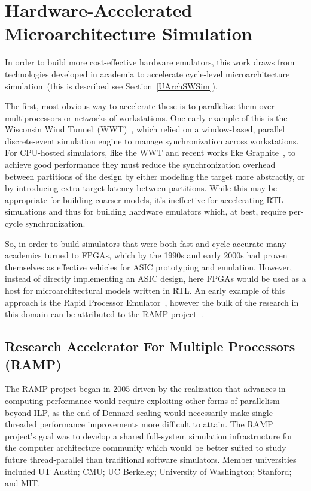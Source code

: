 \section{Hardware-Accelerated Microarchitecture Simulation}

In order to build more cost-effective hardware emulators, this work draws from
technologies developed in academia to accelerate cycle-level microarchitecture
simulation~(this is described see Section~\ref{UArchSWSim}).

The first, most obvious way to accelerate these is to
parallelize them over multiprocessors or networks of workstations.
One early example of this is the Wisconsin Wind Tunnel~(WWT)~\cite{WisconsinWindTunnel}, which relied
on a window-based, parallel discrete-event simulation engine to manage synchronization
across workstations. For CPU-hosted simulators, like the WWT and recent works like Graphite~\cite{Graphite}, to achieve
good performance they must reduce the synchronization overhead between
partitions of the design by either modeling the target more abstractly, or by
introducing extra target-latency between partitions.  While this may be
appropriate for building coarser models, it's ineffective for accelerating RTL
simulations and thus for building hardware emulators which, at best, require
per-cycle synchronization.

So, in order to build simulators that were both fast and cycle-accurate
many academics turned to FPGAs, which by the 1990s and early 2000s had proven themselves as effective
vehicles for ASIC prototyping and emulation. However, instead of directly implementing an
ASIC design, here FPGAs would be used as a host for microarchitectural models written in RTL.
An early example of this approach is the Rapid Processor Emulator~\cite{RPM, RPMDesign}, however the bulk of the research
in this domain can be attributed to the RAMP project~\cite{RAMP}.

\subsection{Research Accelerator For Multiple Processors (RAMP)}

The RAMP project began in 2005 driven by the realization that advances in computing performance
would require exploiting other forms of parallelism beyond ILP, as the end of
Dennard scaling would necessarily make single-threaded performance improvements
more difficult to attain. The RAMP project's goal was to develop a shared full-system
simulation infrastructure for the computer architecture community which would
be better suited to study future thread-parallel than traditional software simulators. Member universities included UT
Austin; CMU; UC Berkeley; University of Washington; Stanford; and MIT.

